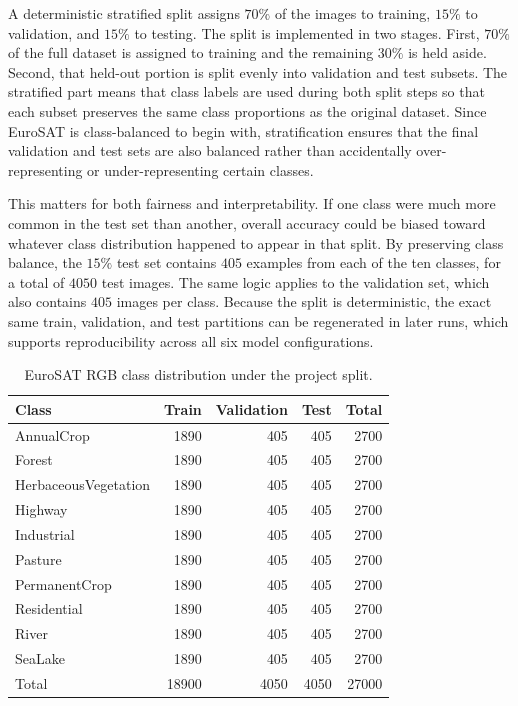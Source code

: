 \documentclass[11pt]{report}
\begin{document}
A deterministic stratified split assigns \(70\%\) of the images to training, \(15\%\) to validation, and \(15\%\) to testing. The split is implemented in two stages. First, \(70\%\) of the full dataset is assigned to training and the remaining \(30\%\) is held aside. Second, that held-out portion is split evenly into validation and test subsets. The stratified part means that class labels are used during both split steps so that each subset preserves the same class proportions as the original dataset. Since EuroSAT is class-balanced to begin with, stratification ensures that the final validation and test sets are also balanced rather than accidentally over-representing or under-representing certain classes.

This matters for both fairness and interpretability. If one class were much more common in the test set than another, overall accuracy could be biased toward whatever class distribution happened to appear in that split. By preserving class balance, the \(15\%\) test set contains \(405\) examples from each of the ten classes, for a total of \(4050\) test images. The same logic applies to the validation set, which also contains \(405\) images per class. Because the split is deterministic, the exact same train, validation, and test partitions can be regenerated in later runs, which supports reproducibility across all six model configurations.

\begin{table}[h]
    \centering
    \caption{EuroSAT RGB class distribution under the project split.}
    \begin{tabular}{lrrrr}
        \toprule
        Class & Train & Validation & Test & Total \\
        \midrule
        AnnualCrop & 1890 & 405 & 405 & 2700 \\
        Forest & 1890 & 405 & 405 & 2700 \\
        HerbaceousVegetation & 1890 & 405 & 405 & 2700 \\
        Highway & 1890 & 405 & 405 & 2700 \\
        Industrial & 1890 & 405 & 405 & 2700 \\
        Pasture & 1890 & 405 & 405 & 2700 \\
        PermanentCrop & 1890 & 405 & 405 & 2700 \\
        Residential & 1890 & 405 & 405 & 2700 \\
        River & 1890 & 405 & 405 & 2700 \\
        SeaLake & 1890 & 405 & 405 & 2700 \\
        \midrule
        Total & 18900 & 4050 & 4050 & 27000 \\
        \bottomrule
    \end{tabular}
\end{table}
\end{document}
